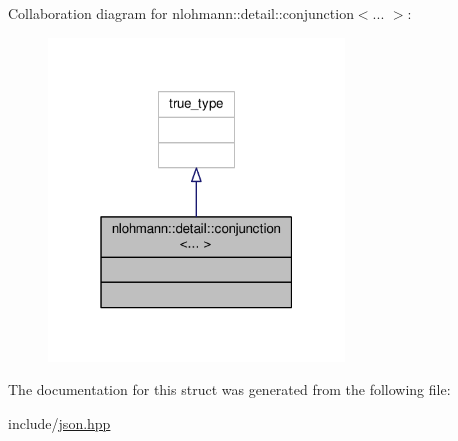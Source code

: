 Collaboration diagram for nlohmann\+:\+:detail\+:\+:conjunction$<$... $>$\+:
\nopagebreak
\begin{figure}[H]
\begin{center}
\leavevmode
\includegraphics[width=223pt]{structnlohmann_1_1detail_1_1conjunction__coll__graph}
\end{center}
\end{figure}


The documentation for this struct was generated from the following file\+:\begin{DoxyCompactItemize}
\item 
include/\hyperlink{json_8hpp}{json.\+hpp}\end{DoxyCompactItemize}
